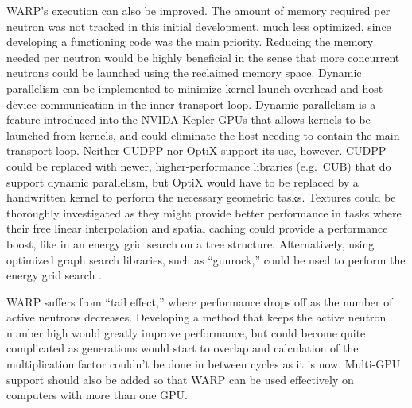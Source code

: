 \documentclass[preprint,12pt]{elsarticle}
\begin{document}
WARP's execution can also be improved.  The amount of memory required per neutron was not tracked in this initial development, much less optimized, since developing a functioning code was the main priority.  Reducing the memory needed per neutron would be highly beneficial in the sense that more concurrent neutrons could be launched using the reclaimed memory space.  Dynamic parallelism can be implemented to minimize kernel launch overhead and host-device communication in the inner transport loop.  Dynamic parallelism is a feature introduced into the NVIDA Kepler GPUs that allows kernels to be launched from kernels, and could eliminate the host needing to contain the main transport loop.  Neither CUDPP nor OptiX support its use, however.  CUDPP could be replaced with newer, higher-performance libraries (e.g.\ CUB) that do support dynamic parallelism, but OptiX would have to be replaced by a handwritten kernel to perform the necessary geometric tasks.  Textures could be thoroughly investigated as they might provide better performance in tasks where their free linear interpolation and spatial caching could provide a performance boost, like in an energy grid search on a tree structure.   Alternatively, using optimized graph search libraries, such as ``gunrock,'' could be used to perform the energy grid search \cite{gunrock}.


WARP suffers from ``tail effect,'' where performance drops off as the number of active neutrons decreases.  Developing a method that keeps the active neutron number high would greatly improve performance, but could become quite complicated as generations would start to overlap and calculation of the multiplication factor couldn't be done in between cycles  as it is now.  Multi-GPU support should also be added so that WARP can be used effectively on computers with more than one GPU.
\end{document}
